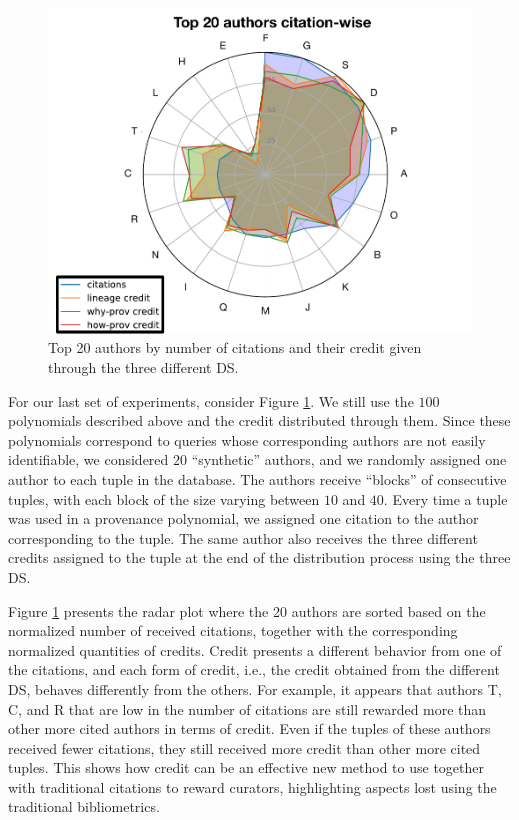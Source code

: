 \begin{figure}[]
\centering
  \includegraphics[width=.8\textwidth]{figures/radar_top_synthetic_enhanced}
  \caption{Top 20 authors by number of citations and their credit given through the three different DS.}
  \label{figure:synthetic_authors}
\end{figure}

For our last set of experiments, consider Figure \ref{figure:synthetic_authors}.
We still use the $100$ polynomials described above and the credit distributed through them. Since these polynomials correspond to queries whose corresponding authors are not easily identifiable, we considered $20$ ``synthetic'' authors, and we randomly assigned one author to each tuple in the database. The authors receive ``blocks'' of consecutive tuples, with each block of the size varying between $10$ and $40$. 
Every time a tuple was used in a provenance polynomial, we assigned one citation to the author corresponding to the tuple.  The same author also receives the three different credits assigned to the tuple at the end of the distribution process using the three DS.

Figure \ref{figure:synthetic_authors} presents the radar plot where the 20 authors are sorted based on the normalized number of received citations, together with the corresponding normalized quantities of credits.
Credit presents a different behavior from one of the citations, and each form of credit, i.e., the credit obtained from the different DS, behaves differently from the others.
For example, it appears that authors T, C, and R that are low in the number of citations are still rewarded more than other more cited authors in terms of credit.
Even if the tuples of these authors received fewer citations, they still received more credit than other more cited tuples. This shows how credit can be an effective new method to use together with traditional citations to reward curators, highlighting aspects lost using the traditional bibliometrics.

